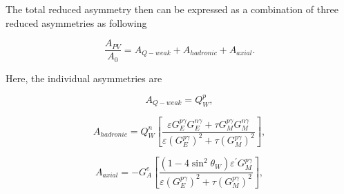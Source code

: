 
%
%

The total reduced asymmetry then can be expressed as a combination of three reduced asymmetries as following

\begin{equation} \label{equ:qweak11}
\frac{A_{PV}}{A_{0}} = A_{Q-weak}  + A_{hadronic}  + A_{axial}.
\end{equation}


Here, the individual asymmetries are

\begin{equation} \label{equ:qweak12}
A_{Q-weak} = Q_{W}^{p},
\end{equation}

\begin{equation} \label{equ:qweak13}
A_{hadronic} = Q_{W}^{n}\left[\frac{{\varepsilon}{G_{E}^{p\gamma}}{G_{E}^{n\gamma}} + {\tau}{G_{M}^{p\gamma}}{G_{M}^{n\gamma}} }{ {\varepsilon}({G_{E}^{p\gamma}})^{2} + {\tau}({G_{M}^{p\gamma}})^{2} } \right],
\end{equation}

\begin{equation} \label{equ:qweak14}
A_{axial} = - G_{A}^{e}\left[\frac{(1-4\sin^{2}\theta_{W}){\varepsilon^{\prime}}G_{M}^{p\gamma} }{ {\varepsilon}({G_{E}^{p\gamma}})^{2} + {\tau}({G_{M}^{p\gamma}})^{2} } \right],
\end{equation}

